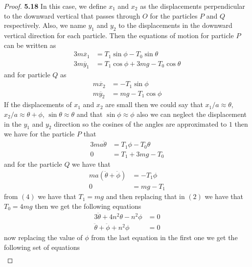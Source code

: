 \documentclass[11pt]{article}
\theoremstyle{definition}
\begin{document}
    \begin{proof}{\textbf{5.18}}
        In this case, we define $x_1$ and $x_2$ as the displacements
        perpendicular to the downward vertical that passes through $O$ for the
        particles $P$ and $Q$ respectively. Also, we name $y_1$ and $y_2$ to 
        the displacements in the downward vertical direction for each particle.
        Then the equations of motion for particle $P$ can be written as
        \begin{align*}
            3m\ddot{x_1} &= T_1\sin\phi -T_0\sin\theta  \\
            3m\ddot{y_1} &= T_1\cos\phi + 3mg - T_0\cos\theta            
        \end{align*}
        and for particle $Q$ as
        \begin{align*}
            m\ddot{x_2} &= - T_1\sin\phi \\
            m\ddot{y_2} &= mg - T_1\cos\phi
        \end{align*}
        If the displacements of $x_1$ and $x_2$ are small then we could say
        that $x_1/a \approx \theta$, $x_2/a \approx \theta + \phi$,
        $\sin\theta \approx \theta$ and that $\sin\phi \approx \phi$ also
        we can neglect the displacement in the $y_1$ and $y_2$ direction so
        the cosines of the angles are approximated to $1$ then we have for the
        particle $P$ that
        \setcounter{equation}{0}
        \begin{align}
            3ma\ddot{\theta} &= T_1\phi - T_0\theta \\
            0 &= T_1 + 3mg - T_0            
        \end{align}
        and for the particle $Q$ we have that
        \begin{align}
            ma(\ddot{\theta} + \ddot{\phi}) &= -T_1\phi \\
            0 &= mg - T_1
        \end{align}
        from $(4)$ we have that $T_1 = mg$ and then replacing that in $(2)$ we
        have that $T_0 = 4mg$ then we get the following equations
        \begin{align*}
            3\ddot{\theta} + 4n^2\theta - n^2\phi &= 0\\
            \ddot{\theta} + \ddot{\phi} + n^2\phi &= 0 
        \end{align*}
        now replacing the value of $\phi$ from the last equation in the first
        one we get the following set of equations
        \begin{align}

\end{align}
\end{proof}
\end{document}
